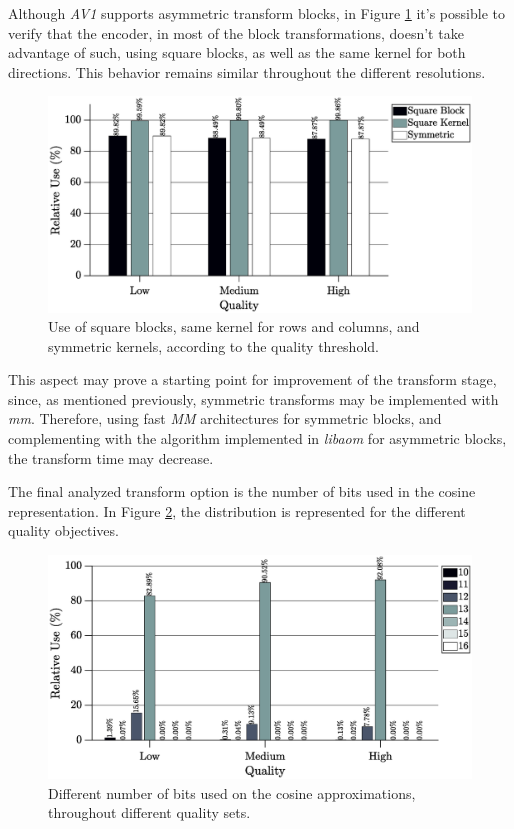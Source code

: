 Although \emph{AV1} supports asymmetric transform blocks, in Figure \ref{fig:squareavg} it's possible to verify that the encoder, in most of the block transformations, doesn't take advantage of such, using square blocks, as well as the same kernel for both directions. This behavior remains similar throughout the different resolutions.

\begin{figure}[!htpb]
    \centering
    \includegraphics[width=\textwidth]{Sections/3Transforms/Images/squareAvg.eps}
    \caption{Use of square blocks, same kernel for rows and columns, and symmetric kernels, according to the quality threshold.}
    \label{fig:squareavg}
\end{figure}

This aspect may prove a starting point for improvement of the transform stage, since, as mentioned previously, symmetric transforms may be implemented with \emph{\gls{mm}}. Therefore, using fast \emph{MM} architectures for symmetric blocks, and complementing with the algorithm implemented in \emph{libaom} for asymmetric blocks, the transform time may decrease.

The final analyzed transform option is the number of bits used in the cosine representation. In Figure \ref{fig:cosbitavg}, the distribution is represented for the different quality objectives. 

\begin{figure}[!htpb]
    \centering
    \includegraphics[width=\textwidth]{Sections/3Transforms/Images/cosBitAvg.eps}
    \caption{Different number of bits used on the cosine approximations, throughout different quality sets.}
    \label{fig:cosbitavg}
\end{figure}

